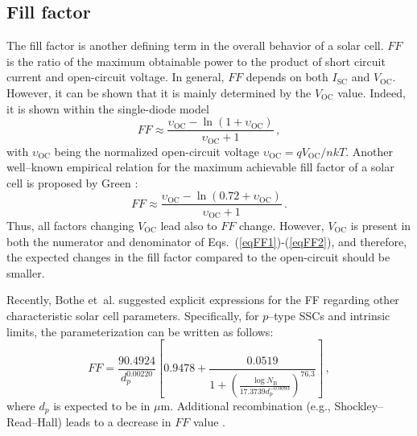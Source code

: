 \documentclass[a4paper,fleqn]{cas-sc}
\begin{document}
\subsection{Fill factor}
The fill factor is another defining term in the overall behavior of a solar cell.
$FF$ is the ratio of the maximum obtainable power to the product of short circuit current and open-circuit voltage.
In general, $FF$ depends on both $I_\mathrm{SC}$ and $V_\mathrm{OC}$.
However, it can be shown that it is mainly determined by the $V_\mathrm{OC}$ value.
Indeed, it is shown \cite{YangHandbookPVSi} within the single-diode model
\begin{equation}
\label{eqFF1}
    FF \approx \frac{\upsilon_\mathrm{OC}-\ln\left(1+\upsilon_\mathrm{OC}\right)}{\upsilon_\mathrm{OC}+1} \,,
\end{equation}
with $\upsilon_\mathrm{OC}$ being the normalized open-circuit voltage
$\upsilon_\mathrm{OC}=qV_\mathrm{OC}/nkT$.
Another well--known empirical relation for the maximum achievable fill factor of a solar cell is proposed by Green \cite{Green1981,Green1982}:
\begin{equation}
\label{eqFF2}
    FF \approx \frac{\upsilon_\mathrm{OC}-\ln\left(0.72+\upsilon_\mathrm{OC}\right)}{\upsilon_\mathrm{OC}+1} \,.
\end{equation}
Thus, all factors changing $V_\mathrm{OC}$ lead also to $FF$ change.
However, $V_\mathrm{OC}$ is present in both the numerator and denominator of Eqs.~(\ref{eqFF1})-(\ref{eqFF2}),
and therefore, the expected changes in the fill factor compared to the open-circuit should be smaller.

Recently, Bothe et~al. \cite{Bothe2023} suggested explicit expressions for the FF regarding other characteristic solar cell parameters.
Specifically, for $p$--type SSCs and intrinsic limits, the parameterization can be written as follows:
\begin{equation}
\label{eqFF3}
    FF = \frac{90.4924}{d_p^{0.00220}}\left[0.9478+\frac{0.0519}{1+\left(\frac{\log N_\mathrm{B}}{17.3739 d_p^{-0.0093}}\right)^{76.3}}\right] \,,
\end{equation}
where
$d_p$ is expected to be in $\mu$m.
Additional recombination (e.g., Shockley–Read–Hall) leads to a decrease in $FF$ value \cite{Bothe2023}.
\end{document}
